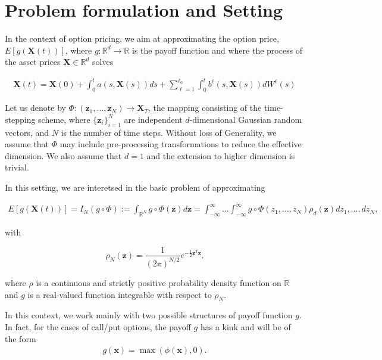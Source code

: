 \documentclass[11pt]{article}
\newcommand{\rset}{\mathbb{R}}
\newcommand{\PERIOD}{.}
\newcommand{\COMMA}{,}
\begin{document}
\section{Problem formulation and Setting}\label{sec:General setting}


In the context of option pricing, we aim at approximating the option price, $E[g(\mathbf{X}(t))]$,  where $g:\mathbb{R}^d  \rightarrow \mathbb{R}$ is the payoff function  and where  the process of the asset prices $\mathbf{X} \in \mathbb{R}^d$ solves 

\begin{align}
	\mathbf{X}(t)=\mathbf{X}(0)+ \int_{0}^{t} a(s,\mathbf{X}(s)) ds + \sum_{\ell=1}^{\ell_0} \int_{0}^{t} b^{\ell}(s,\mathbf{X}(s)) dW^{\ell}(s)
\end{align}

Let us denote  by $\Phi: (\mathbf{z}_1,\dots,\mathbf{z}_N) \rightarrow \mathbf{X}_T$, the mapping consisting of the time-stepping scheme, where $\{\mathbf{z}_i\}_{i=1}^N$ are independent $d$-dimensional Gaussian random vectors, and $N$ is the number of time steps. Without loss of Generality, we assume that $\Phi$ may include pre-processing transformations to reduce the effective dimension. We also assume that $d=1$ and the extension to higher dimension is trivial.

In this setting, we are interetsed in the basic problem of approximating

\begin{align}\label{eq:multivariate integral}
E[g(\mathbf{X}(t))]=I_N (g \circ \Phi) :=\int_{\rset^N}g \circ \Phi(\mathbf{z})	d \mathbf{z}= \int_{-\infty}^{\infty} \dots \int_{-\infty}^{\infty} g \circ \Phi(z_1,\dots,z_N) \rho_d(\mathbf{z}) dz_1,\dots,dz_N \COMMA
\end{align}


with

\begin{equation}\label{eq: multivariate gaussian distribution}
\rho_N(\mathbf{z})=\frac{1}{(2 \pi)^{N/2}} e^{-\frac{1}{2} \mathbf{z}^T \mathbf{z}} \PERIOD
\end{equation} 

where $\rho$ is a continuous and strictly positive probability density function on $\rset$ and $g$ is a real-valued function integrable with respect to $\rho_N$.
 
In this context, we work mainly with two possible structures of payoff function $g$. In fact, for the cases of call/put options, the payoff $g$ has a kink and  will be of the form 
\begin{align}\label{eq:payoffs_with_kink}
g(\mathbf{x})=\max(\phi(\mathbf{x}),0).
\end{align}
\end{document}
